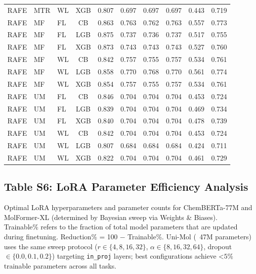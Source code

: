 \documentclass[9pt,a4paper]{article}
\begin{document}
\begin{scriptsize}
\begin{longtable}{lllcrrrrrr}
RAFE & MTR & WL & XGB & 0.807 & 0.697 & 0.697 & 0.697 & 0.443 & 0.719 \\
RAFE & MF  & FL & CB  & 0.863 & 0.763 & 0.762 & 0.763 & 0.557 & 0.773 \\
RAFE & MF  & FL & LGB & 0.875 & 0.737 & 0.736 & 0.737 & 0.517 & 0.755 \\
RAFE & MF  & FL & XGB & 0.873 & 0.743 & 0.743 & 0.743 & 0.527 & 0.760 \\
RAFE & MF  & WL & CB  & 0.842 & 0.757 & 0.755 & 0.757 & 0.534 & 0.761 \\
RAFE & MF  & WL & LGB & 0.858 & 0.770 & 0.768 & 0.770 & 0.561 & 0.774 \\
RAFE & MF  & WL & XGB & 0.854 & 0.757 & 0.755 & 0.757 & 0.534 & 0.761 \\
RAFE & UM  & FL & CB  & 0.846 & 0.704 & 0.704 & 0.704 & 0.453 & 0.724 \\
RAFE & UM  & FL & LGB & 0.839 & 0.704 & 0.704 & 0.704 & 0.469 & 0.734 \\
RAFE & UM  & FL & XGB & 0.840 & 0.704 & 0.704 & 0.704 & 0.478 & 0.739 \\
RAFE & UM  & WL & CB  & 0.842 & 0.704 & 0.704 & 0.704 & 0.453 & 0.724 \\
RAFE & UM  & WL & LGB & 0.807 & 0.684 & 0.684 & 0.684 & 0.424 & 0.711 \\
RAFE & UM  & WL & XGB & 0.822 & 0.704 & 0.704 & 0.704 & 0.461 & 0.729 \\
\end{longtable}
\end{scriptsize}

\newpage

\subsection*{Table S6: LoRA Parameter Efficiency Analysis}

Optimal LoRA hyperparameters and parameter counts for ChemBERTa-77M and MolFormer-XL
(determined by Bayesian sweep via Weights \& Biases).
Trainable\% refers to the fraction of total model parameters that are updated during
finetuning. Reduction\% = 100 $-$ Trainable\%.
Uni-Mol (~47M parameters) uses the same sweep protocol ($r \in \{4,8,16,32\}$,
$\alpha \in \{8,16,32,64\}$, dropout $\in \{0.0, 0.1, 0.2\}$) targeting
\texttt{in\_proj} layers; best configurations achieve <$5\%$ trainable parameters
across all tasks.
\end{document}
